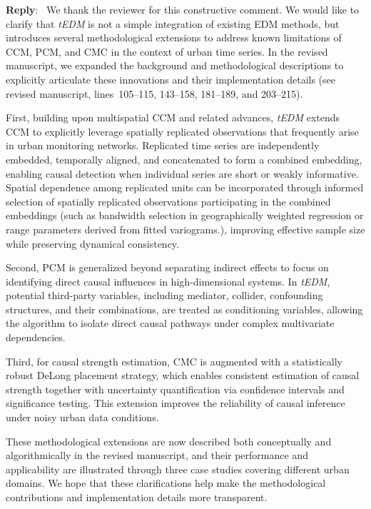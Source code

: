 \documentclass[11pt]{article}
\newcounter{reviewer}
\newenvironment{reply}
   {\medskip \noindent \color{blue} \begin{sf}\textbf{Reply}:\  }
   {\medskip \par \end{sf}}
\begin{document}
\begin{reply}
We thank the reviewer for this constructive comment. We would like to clarify that \textit{tEDM} is not a simple integration of existing EDM methods, but introduces several methodological extensions to address known limitations of CCM, PCM, and CMC in the context of urban time series. In the revised manuscript, we expanded the background and methodological descriptions to explicitly articulate these innovations and their implementation details (see revised manuscript, lines~105--115, 143--158, 181--189, and 203--215).

First, building upon multispatial CCM and related advances, \textit{tEDM} extends CCM to explicitly leverage spatially replicated observations that frequently arise in urban monitoring networks. Replicated time series are independently embedded, temporally aligned, and concatenated to form a combined embedding, enabling causal detection when individual series are short or weakly informative. Spatial dependence among replicated units can be incorporated through informed selection of spatially replicated observations participating in the combined embeddings (such as bandwidth selection in geographically weighted regression or range parameters derived from fitted variograms.), improving effective sample size while preserving dynamical consistency.

Second, PCM is generalized beyond separating indirect effects to focus on identifying direct causal influences in high-dimensional systems. In \textit{tEDM}, potential third-party variables, including mediator, collider, confounding structures, and their combinations, are treated as conditioning variables, allowing the algorithm to isolate direct causal pathways under complex multivariate dependencies.

Third, for causal strength estimation, CMC is augmented with a statistically robust DeLong placement strategy, which enables consistent estimation of causal strength together with uncertainty quantification via confidence intervals and significance testing. This extension improves the reliability of causal inference under noisy urban data conditions.

These methodological extensions are now described both conceptually and algorithmically in the revised manuscript, and their performance and applicability are illustrated through three case studies covering different urban domains. We hope that these clarifications help make the methodological contributions and implementation details more transparent.
\end{reply}
\end{document}
